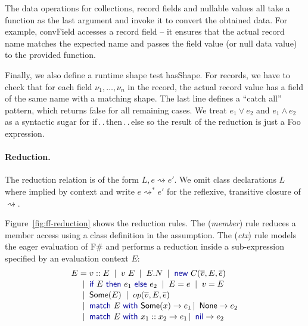 \documentclass[10pt,preprint,clearpagebib]{sigplanconf}
\newcommand{\kvd}[1]{\textnormal{\textcolor{kvdclr}{\sffamily #1}}}
\newcommand{\ident}[1]{\textnormal{\sffamily #1}}
\newcommand{\lsep}[0]{\;\; | \;\;}
\newcommand{\narrow}[1]{\hspace{-0.7em} #1 \hspace{-0.7em}}
\newcommand{\reduce}{\rightsquigarrow}
\begin{document}
The data operations for collections, record fields and nullable values all take a function
as the last argument and invoke it to convert the obtained data. For example, \ident{convField} 
accesses a record field -- it ensures that the actual record name matches the expected name and 
passes the field value (or \kvd{null} data value) to the provided function.

Finally, we also define a runtime shape test \ident{hasShape}.
For records, we have to check that for each field $\nu_1, \ldots, \nu_n$ 
in the record, the actual record value has a field of the same name with a matching shape. The last 
line defines a ``catch all'' pattern, which returns \kvd{false} for all remaining cases. 
We treat $e_1 \vee e_2$ and $e_1 \wedge e_2$ as a syntactic sugar for \kvd{if}\,.\,.\,\kvd{then}\,.\,.\,\kvd{else} so
the result of the reduction is just a Foo expression.


\paragraph{Reduction.}
The reduction relation is of the form $L, e \reduce e'$. We omit class declarations 
$L$ where implied by context and write $e \reduce^{*} e'$ for
the reflexive, transitive closure of $\reduce$. 

Figure~\ref{fig:ff-reduction} shows the reduction rules.  The (\emph{member}) rule reduces a member access using a class 
definition in the assumption. The (\emph{ctx}) rule models the eager
evaluation of F\# and performs a reduction inside a sub-expression specified by an evaluation 
context $E$:
%
\begin{equation*}
\begin{array}{rcl}
 E &\narrow{=}& v::E \lsep v~E \lsep E.N \lsep \kvd{new}~C(\overline{v}, E, \overline{e})\\[0.1em]
   &\narrow{|}&  \kvd{if}~E~\kvd{then}~e_1~\kvd{else}~e_2  \lsep E = e \lsep v = E \\[0.1em]
   &\narrow{|}& \ident{Some}(E) \lsep op(\overline{v}, E, \overline{e})\\[0.1em]
   &\narrow{|}& \kvd{match}~E~\kvd{with}~\ident{Some}(x) \rightarrow e_1 \,|\, \ident{None} \rightarrow e_2 \\[0.1em]
   &\narrow{|}& \kvd{match}~E~\kvd{with}~x_1 :: x_2 \rightarrow e_1 \,|\, \kvd{nil} \rightarrow e_2
\end{array} 
\end{equation*}
\end{document}
